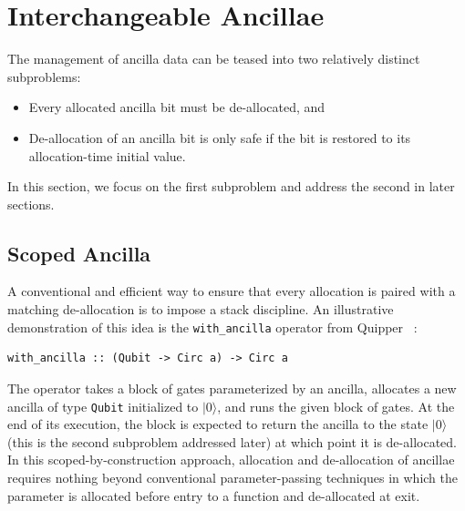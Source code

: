 \documentclass[sigplan,10pt,review,anonymous]{acmart}
\newcommand{\ket}[1]{|#1\rangle}
\begin{document}
\section{Interchangeable Ancillae}
\label{sec:dyn}

The management of ancilla data can be teased into two relatively
distinct subproblems:
\begin{itemize}
\item Every allocated ancilla bit must be de-allocated, and 
\item De-allocation of an ancilla bit is only safe if the bit is
  restored to its allocation-time initial value.
\end{itemize}
In this section, we focus on the first subproblem and address the
second in later sections.

\subsection{Scoped Ancilla}

A conventional and efficient way to ensure that every allocation is
paired with a matching de-allocation is to impose a stack
discipline. An illustrative demonstration of this idea is the
\verb|with_ancilla| operator from
Quipper~\cite{Green:2013:QSQ:2491956.2462177} :
\begin{verbatim}
with_ancilla :: (Qubit -> Circ a) -> Circ a
\end{verbatim}
The operator takes a block of gates parameterized by an ancilla,
allocates a new ancilla of type \verb|Qubit| initialized to $\ket{0}$,
and runs the given block of gates. At the end of its execution, the
block is expected to return the ancilla to the state $\ket{0}$ (this
is the second subproblem addressed later) at which point it is
de-allocated. In this scoped-by-construction approach, allocation and
de-allocation of ancillae requires nothing beyond conventional
parameter-passing techniques in which the parameter is allocated
before entry to a function and de-allocated at exit.
\end{document}
